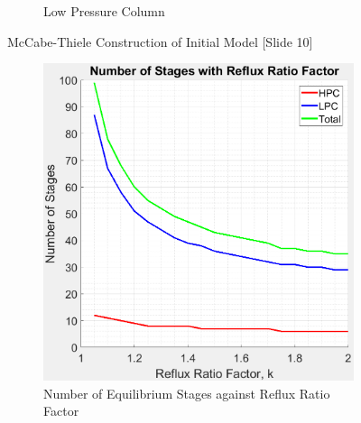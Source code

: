 \begin{figure}[ht]
\begin{subfigure}{0.49\textwidth}
            \caption{Low Pressure Column}
            \label{fig:LPC_v0}
        \end{subfigure}
        \caption{McCabe-Thiele Construction of Initial Model [Slide 10]}
        \label{fig:mccabe_v0}
    \end{figure}
    
    \begin{figure}[ht]
        \begin{subfigure}{0.49\textwidth}
            \centering
            \includegraphics[width=\linewidth]{airseparation/handouts/graphics/graph-stages_vs_R_va.jpeg}
            \caption{Number of Equilibrium Stages against \newline Reflux Ratio Factor}
            \label{fig:stage_vs_R}
        \end{subfigure}
        \hspace*{\fill} %
        \begin{subfigure}{0.49\textwidth}
            \centering

\end{subfigure}
\end{figure}
